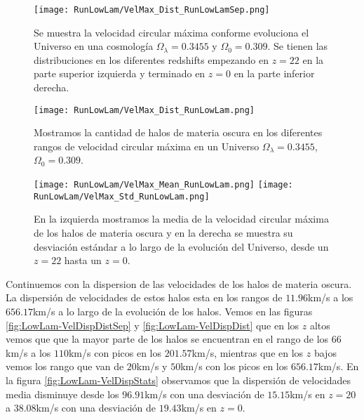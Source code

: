 \begin{figure}[H]
    \centering
    \texttt{[image: RunLowLam/VelMax\_Dist\_RunLowLamSep.png]}
    \caption[Velocidad circular máxima]{\footnotesize Se muestra la velocidad circular máxima conforme evoluciona el Universo en una cosmología $\Omega_\lambda = 0.3455$ y $\Omega_0 = 0.309$. Se tienen las distribuciones en los diferentes redshifts empezando en $z=22$ en la parte superior izquierda y terminado en $z=0$ en la parte inferior derecha.}
    \label{fig:LowLam-VelMaxDistSep}
\end{figure}

\begin{figure}[H]
    \centering
    \texttt{[image: RunLowLam/VelMax\_Dist\_RunLowLam.png]}
    \caption[Distribución de la velocidad circular máxima]{\footnotesize Mostramos la cantidad de halos de materia oscura en los diferentes rangos de velocidad circular máxima en un Universo $\Omega_\lambda = 0.3455$, $\Omega_0 = 0.309$.}
    \label{fig:LowLam-VelMaxDist}
\end{figure}

\begin{figure}[H]
    \centering
    \texttt{[image: RunLowLam/VelMax\_Mean\_RunLowLam.png]}
    \texttt{[image: RunLowLam/VelMax\_Std\_RunLowLam.png]}
    \caption[Media y desviación estándar de la velocidad circular máxima]{\footnotesize En la izquierda mostramos la media de la velocidad circular máxima de los halos de materia oscura y en la derecha se muestra su desviación estándar a lo largo de la evolución del Universo, desde un $z=22$ hasta un $z=0$.}
    \label{fig:LowLam-VelMaxStats}
\end{figure}

Continuemos con la dispersion de las velocidades de los halos de materia oscura. La dispersión de velocidades de estos halos esta en los rangos de $11.96$km/s a los $656.17$km/s a lo largo de la evolución de los halos. Vemos en las figuras \ref{fig:LowLam-VelDispDistSep} y \ref{fig:LowLam-VelDispDist} que en los $z$ altos vemos que que la mayor parte de los halos se encuentran en el rango de los $66$km/s a los $110$km/s con picos en los $201.57$km/s, mientras que en los $z$ bajos vemos los rango que van de $20$km/s y $50$km/s con los picos en los $656.17$km/s. En la figura \ref{fig:LowLam-VelDispStats} observamos que la dispersión de velocidades media disminuye desde los $96.91$km/s con una desviación de $15.15$km/s en $z=20$ a $38.08$km/s con una desviación de $19.43$km/s en $z=0$.

